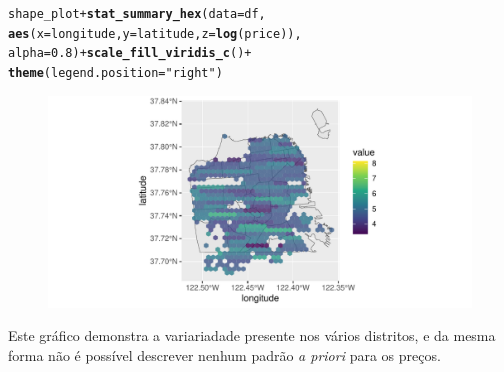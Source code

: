 \documentclass[justified, 11pt]{scrartcl}\usepackage[]{graphicx}\usepackage[]{xcolor}
\makeatletter
\def\maxwidth{ %
  \ifdim\Gin@nat@width>\linewidth
    \linewidth
  \else
    \Gin@nat@width
  \fi
}
\newcommand{\hlnum}[1]{\textcolor[rgb]{0.686,0.059,0.569}{#1}}%
\newcommand{\hlstr}[1]{\textcolor[rgb]{0.192,0.494,0.8}{#1}}%
\newcommand{\hlopt}[1]{\textcolor[rgb]{0,0,0}{#1}}%
\newcommand{\hlstd}[1]{\textcolor[rgb]{0.345,0.345,0.345}{#1}}%
\newcommand{\hlkwc}[1]{\textcolor[rgb]{0.333,0.667,0.333}{#1}}%
\newcommand{\hlkwd}[1]{\textcolor[rgb]{0.737,0.353,0.396}{\textbf{#1}}}%
\newenvironment{kframe}{%
 \def\at@end@of@kframe{}%
 \ifinner\ifhmode%
  \def\at@end@of@kframe{\end{minipage}}%
  \begin{minipage}{\columnwidth}%
 \fi\fi%
 \def\FrameCommand##1{\hskip\@totalleftmargin \hskip-\fboxsep
 \colorbox{shadecolor}{##1}\hskip-\fboxsep
     \hskip-\linewidth \hskip-\@totalleftmargin \hskip\columnwidth}%
 \MakeFramed {\advance\hsize-\width
   \@totalleftmargin\z@ \linewidth\hsize
   \@setminipage}}%
 {\par\unskip\endMakeFramed%
 \at@end@of@kframe}
\newenvironment{knitrout}{}{} %
\makeatother
\begin{document}
\begin{knitrout}
\color{fgcolor}\begin{kframe}
\begin{alltt}
\hlstd{shape_plot} \hlopt{+} \hlkwd{stat_summary_hex}\hlstd{(}\hlkwc{data} \hlstd{= df,}
    \hlkwd{aes}\hlstd{(}\hlkwc{x} \hlstd{= longitude,} \hlkwc{y} \hlstd{= latitude,} \hlkwc{z} \hlstd{=} \hlkwd{log}\hlstd{(price)),}
    \hlkwc{alpha} \hlstd{=} \hlnum{0.8}\hlstd{)} \hlopt{+} \hlkwd{scale_fill_viridis_c}\hlstd{()} \hlopt{+}
    \hlkwd{theme}\hlstd{(}\hlkwc{legend.position} \hlstd{=} \hlstr{"right"}\hlstd{)}
\end{alltt}


{\ttfamily\noindent\color{warningcolor}{\#\# Warning: Removed 3 rows containing non-finite values (`stat\_summary\_hex()`).}}\end{kframe}\begin{figure}
\includegraphics[width=\maxwidth]{figure/chunk-priceHexes-1} \end{figure}

\end{knitrout}

Este gráfico demonstra a variariadade presente nos vários distritos, e da mesma forma não é possível descrever nenhum padrão \textit{a priori} para os preços. \\
\end{document}
